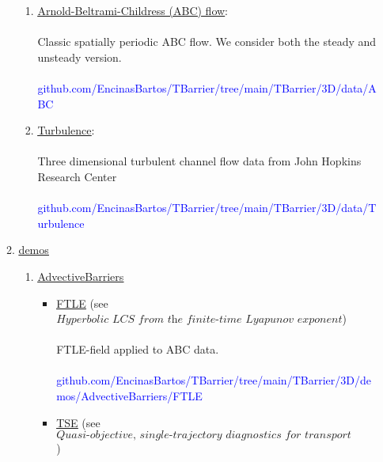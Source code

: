 \documentclass{article}
\begin{document}
\begin{enumerate}
\begin{enumerate}
 \begin{enumerate}
 \item \href{https://github.com/EncinasBartos/TBarrier/tree/main/TBarrier/3D/data/ABC}{\underline{Arnold-Beltrami-Childress (ABC) flow}}: \\ \\
 Classic spatially periodic ABC flow. We consider both the steady and unsteady version. \\ \\
 \textcolor{blue}{{\footnotesize github.com/EncinasBartos/TBarrier/tree/main/TBarrier/3D/data/ABC}} \\ 
 \item \href{https://github.com/EncinasBartos/TBarrier/tree/main/TBarrier/3D/data/Turbulence}{\underline{Turbulence}}: \\ \\
 Three dimensional turbulent channel flow data from John Hopkins Research Center \\ \\
  \textcolor{blue}{{\footnotesize github.com/EncinasBartos/TBarrier/tree/main/TBarrier/3D/data/Turbulence}} \\ 
 \end{enumerate}
  \item \href{https://github.com/EncinasBartos/TBarrier/tree/main/TBarrier/3D/demos}{\underline{demos}}
\begin{enumerate}
 \item \href{https://github.com/EncinasBartos/TBarrier/tree/main/TBarrier/3D/demos/AdvectiveBarriers}{\underline{AdvectiveBarriers}} \\
  \begin{itemize}
  \item \href{https://github.com/EncinasBartos/TBarrier/tree/main/TBarrier/3D/demos/AdvectiveBarriers/FTLE}{\underline{FTLE}} (see $ \textit{Hyperbolic LCS from the finite-time Lyapunov exponent} $) \\ \\
FTLE-field applied to ABC data. \\ \\
\textcolor{blue}{{\footnotesize github.com/EncinasBartos/TBarrier/tree/main/TBarrier/3D/demos/AdvectiveBarriers/FTLE}} \\
\item \href{https://github.com/EncinasBartos/TBarrier/tree/main/TBarrier/3D/demos/AdvectiveBarriers/TSE}{\underline{TSE}} (see $ \textit{Quasi-objective, single-trajectory diagnostics for transport
barriers} $) \\ \\

\end{itemize}
\end{enumerate}
\end{enumerate}
\end{enumerate}
\end{document}
